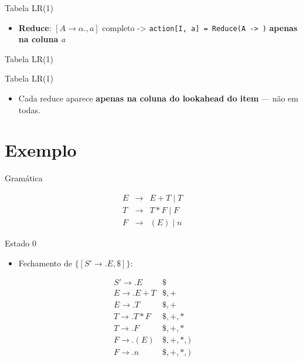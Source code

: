 \begin{frame}[fragile]{Tabela LR(1)}

    \begin{itemize}

        \item
        \textbf{Reduce}: \([A \to \alpha ., a]\) completo ->
        \texttt{action[I, a] = Reduce(A -> \alpha{})} \textbf{apenas
        na coluna \(a\)}
    \end{itemize}
\end{frame}

\begin{frame}[fragile]{Tabela LR(1)}

\end{frame}

\begin{frame}{Tabela LR(1)}

    \begin{itemize}

        \item
        Cada reduce aparece \textbf{apenas na coluna do lookahead do item} ---
        não em todas.
    \end{itemize}
\end{frame}


\section{Exemplo}\label{exemplo}

\begin{frame}{Gramática}

    \[\begin{array}{lcl}
    E &\to& E + T \mid T \\
    T &\to& T * F \mid F \\
    F &\to& (E) \mid n
\end{array}\]
\end{frame}

\begin{frame}{Estado 0}

    \begin{itemize}

        \item
        Fechamento de \(\{[S' \to . E, \$]\}\):
    \end{itemize}

    \[\begin{array}{ll}
    S' \to . E & \$ \\
    E \to . E + T & \$, + \\
    E \to . T & \$, + \\
    T \to . T * F & \$, +, * \\
    T \to . F & \$, +, * \\
    F \to . (E) & \$, +, *, ) \\
    F \to . n & \$, +, *, )
\end{array}\]
\end{frame}

